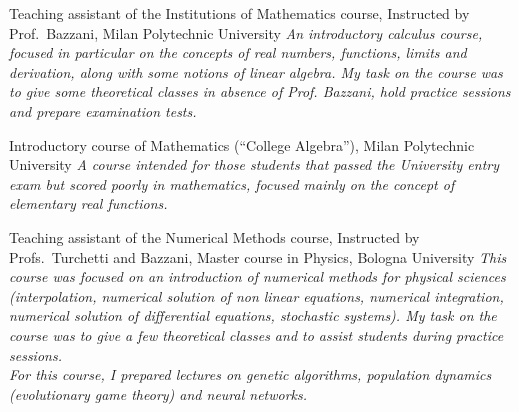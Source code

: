 \documentclass[helvetica,narrow,openbib,notitle,noflag, nologo]{europecv}
\begin{document}
\begin{europecv}
 {Teaching assistant of the Institutions of Mathematics course, Instructed by Prof.~Bazzani, Milan Polytechnic University}
\ecvitem{} {\it An introductory calculus course, focused in particular on the concepts of real numbers, functions, limits and derivation,
along with some notions of linear algebra. My task on the course was to give some theoretical classes in absence of Prof. Bazzani, hold practice sessions and prepare examination tests.\\}

 {Introductory course of Mathematics (``College Algebra''), Milan Polytechnic University}
\ecvitem{} {\it A course intended for those students that passed the University entry exam but scored poorly in
mathematics, focused mainly on the concept of elementary real functions.\\}

 {Teaching assistant of the Numerical Methods course, Instructed by Profs.~Turchetti and Bazzani, Master course in Physics, Bologna University}
\ecvitem{} {\it This course was focused on an introduction of 
numerical methods for physical sciences (interpolation, numerical solution of non linear
equations,
numerical integration, numerical solution of differential equations, stochastic systems). My task on the course was to give a few theoretical classes
and to assist students during practice sessions.\\}
\ecvitem{} {\it For this course, I prepared lectures on genetic algorithms, population dynamics (evolutionary game theory) and neural networks.\\}
\newpage



\end{europecv}
\end{document}
